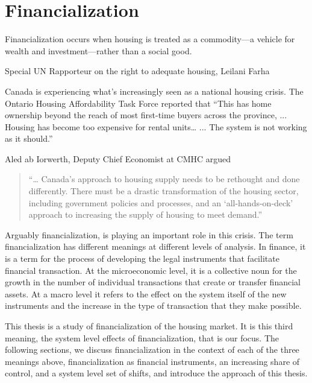 \chapter{Financialization} \label{chapter-financialization}
\epigraph{Financialization  occurs when housing is treated as a commodity—a vehicle for wealth and investment—rather than a social good.}{Special UN Rapporteur on the right to adequate housing, Leilani Farha}


Canada is experiencing what's increasingly seen as a national housing crisis. The Ontario Housing Affordability Task Force reported that ``This has home ownership beyond the reach of most first-time buyers across the province, ... Housing has become too expensive for rental units…  ... %
The system is not working as it should.''

Aled ab Iorwerth, Deputy Chief Economist at CMHC argued
\begin{quotation}
     “… Canada’s approach to housing supply needs to be rethought and done differently. There must be a drastic transformation of the housing sector, including government policies and processes, and an ‘all-hands-on-deck’ approach to increasing the supply of housing to meet demand.”\cite{CanadaHousingSupply2022}
\end{quotation}

Arguably financialization, %
is playing an important role in this crisis. The term financialization has different meanings at different levels of analysis. In finance, it is a term for the process of developing the legal instruments that facilitate financial transaction. At the microeconomic level, it is a collective noun for the growth in the number of individual transactions that create or transfer financial assets. At a macro level it refers to the effect on the system itself of the new instruments and the increase in the type of transaction that they make possible.

This thesis is a study of financialization of the housing market. It is this third meaning, the system level effects of financialization, that is our focus. The following sections, we discuss financialization in the context of each of the three meanings above, financialization as financial instruments, an increasing share of control, and a system level set of shifts, and introduce the approach of this thesis. 

